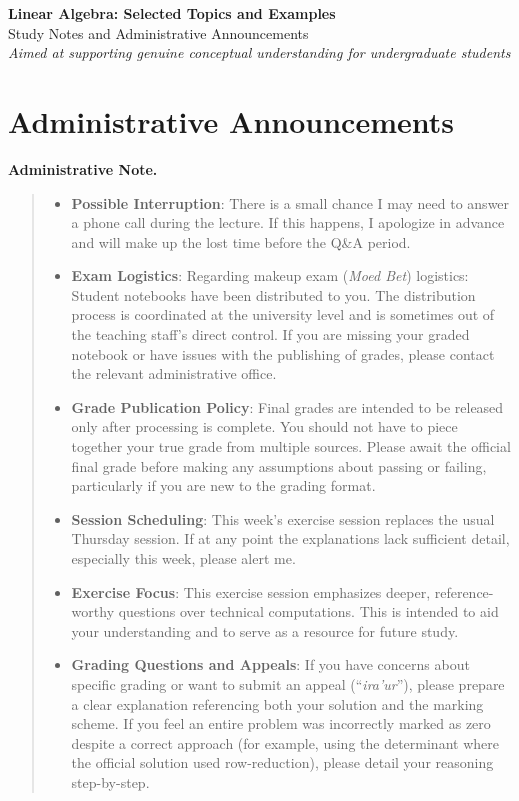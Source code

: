 \documentclass[12pt]{article}
\newenvironment{announcement}
  {\medskip\noindent\textbf{Administrative Note.}\begin{quote}\small}
  {\end{quote}\medskip}
\begin{document}
\begin{center}
    {\LARGE \textbf{Linear Algebra: Selected Topics and Examples}}\\[0.5em]
    {\large Study Notes and Administrative Announcements}\\
    \vspace{1em}
    \textit{Aimed at supporting genuine conceptual understanding for undergraduate students}
\end{center}

\section*{Administrative Announcements}
\begin{announcement}
\begin{itemize}
    \item \textbf{Possible Interruption}: There is a small chance I may need to answer a phone call during the lecture. If this happens, I apologize in advance and will make up the lost time before the Q\&A period.
    \item \textbf{Exam Logistics}: Regarding makeup exam (\emph{Moed Bet}) logistics: Student notebooks have been distributed to you. The distribution process is coordinated at the university level and is sometimes out of the teaching staff's direct control. If you are missing your graded notebook or have issues with the publishing of grades, please contact the relevant administrative office.
    \item \textbf{Grade Publication Policy}: Final grades are intended to be released only after processing is complete. You should not have to piece together your true grade from multiple sources. Please await the official final grade before making any assumptions about passing or failing, particularly if you are new to the grading format.
    \item \textbf{Session Scheduling}: This week's exercise session replaces the usual Thursday session. If at any point the explanations lack sufficient detail, especially this week, please alert me.
    \item \textbf{Exercise Focus}: This exercise session emphasizes deeper, reference-worthy questions over technical computations. This is intended to aid your understanding and to serve as a resource for future study.
    \item \textbf{Grading Questions and Appeals}: If you have concerns about specific grading or want to submit an appeal (``\emph{ira'ur}''), please prepare a clear explanation referencing both your solution and the marking scheme. If you feel an entire problem was incorrectly marked as zero despite a correct approach (for example, using the determinant where the official solution used row-reduction), please detail your reasoning step-by-step.

\end{itemize}
\end{announcement}
\end{document}
